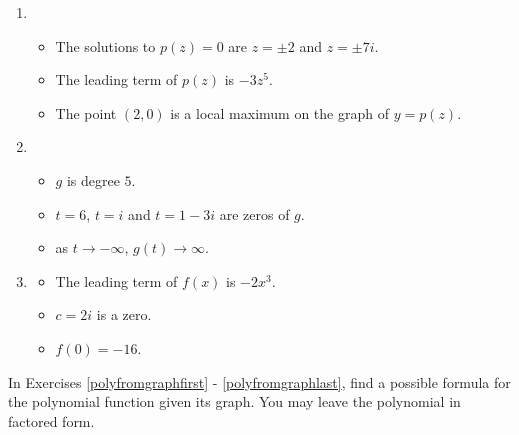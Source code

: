 \begin{enumerate}
\item

\begin{itemize}

\item The solutions to $p(z) = 0$ are $z = \pm 2$ and $z=\pm 7i$.
\item The leading term of $p(z)$ is $-3z^5$.
\item The point $(2,0)$ is a local maximum on the graph of $y=p(z)$.

\end{itemize}


\item

\begin{itemize}

\item $g$ is degree $5$.
\item $t=6$, $t = i$ and $t = 1-3i$ are zeros of $g$.
\item as $t \rightarrow -\infty$, $g(t) \rightarrow \infty$.

\end{itemize}

\item \label{buildcompolylast}

\begin{itemize}

\item The leading term of $f(x)$ is $-2x^3$.
\item $c=2i$ is a zero.
\item $f(0) = -16$.

\end{itemize}

\setcounter{HW}{\value{enumi}}
\end{enumerate}



In Exercises \ref{polyfromgraphfirst} - \ref{polyfromgraphlast}, find a possible formula for the polynomial function given its graph.  You may leave the polynomial in factored form. 

